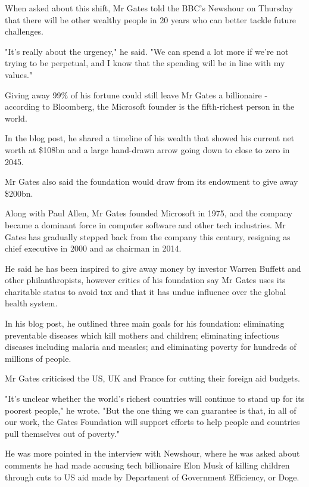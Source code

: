 \documentclass[10pt,a4paper]{article}
\begin{document}
\par\medskip
When asked about this shift, Mr Gates told the BBC's Newshour on Thursday that there will be other wealthy people in 20 years who can better tackle future challenges.
\par\medskip
"It's really about the urgency," he said. "We can spend a lot more if we're not trying to be perpetual, and I know that the spending will be in line with my values."
\par\medskip
Giving away 99\% of his fortune could still leave Mr Gates a billionaire - according to Bloomberg, the Microsoft founder is the fifth-richest person in the world.
\par\medskip
In the blog post, he shared a timeline of his wealth that showed his current net worth at \$108bn and a large hand-drawn arrow going down to close to zero in 2045.
\par\medskip
Mr Gates also said the foundation would draw from its endowment to give away \$200bn.
\par\medskip
Along with Paul Allen, Mr Gates founded Microsoft in 1975, and the company became a dominant force in computer software and other tech industries. Mr Gates has gradually stepped back from the company this century, resigning as chief executive in 2000 and as chairman in 2014.
\par\medskip
He said he has been inspired to give away money by investor Warren Buffett and other philanthropists, however critics of his foundation say Mr Gates uses its charitable status to avoid tax and that it has undue influence over the global health system.
\par\medskip
In his blog post, he outlined three main goals for his foundation: eliminating preventable diseases which kill mothers and children; eliminating infectious diseases including malaria and measles; and eliminating poverty for hundreds of millions of people.
\par\medskip
Mr Gates criticised the US, UK and France for cutting their foreign aid budgets.
\par\medskip
"It's unclear whether the world's richest countries will continue to stand up for its poorest people," he wrote. "But the one thing we can guarantee is that, in all of our work, the Gates Foundation will support efforts to help people and countries pull themselves out of poverty."
\par\medskip
He was more pointed in the interview with Newshour, where he was asked about comments he had made accusing tech billionaire Elon Musk of killing children through cuts to US aid made by Department of Government Efficiency, or Doge.
\end{document}
